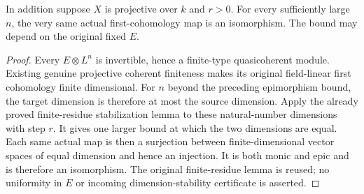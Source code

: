 \begin{theorem}
\label{thm:seshadri-fixed-coefficient-cut-eventual-hone-iso}
\leanok
{}
In addition suppose $X$ is projective over $k$ and $r>0$. For every
sufficiently large $n$, the very same actual first-cohomology map is an
isomorphism. The bound may depend on the original fixed $E$.
\end{theorem}
\begin{proof}
Every $E\otimes L^n$ is invertible, hence a finite-type quasicoherent
module. Existing genuine projective coherent finiteness makes its
original field-linear first cohomology finite dimensional.
For $n$ beyond the preceding epimorphism bound, the target dimension is
therefore at most the source dimension. Apply the already proved
finite-residue stabilization lemma to these natural-number dimensions
with step $r$. It gives one larger bound at which the two dimensions
are equal. Each same actual map is then a surjection between
finite-dimensional vector spaces of equal dimension and hence an
injection. It is both monic and epic and is therefore an isomorphism.
The original finite-residue lemma is reused; no uniformity in $E$ or
incoming dimension-stability certificate is asserted.
\end{proof}


